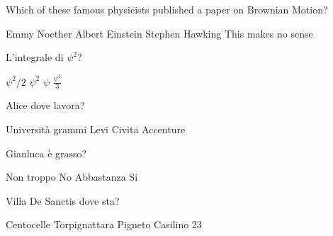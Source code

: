 \documentclass{exam}
\begin{document}
\begin{center}
\end{center}
\vspace{5mm}
\vspace{5mm}
\vspace{5mm}
\begin{questions}
\question[10] Which of these famous physicists published a paper on Brownian Motion?
\begin{choices}
\choice Emmy Noether
\choice Albert Einstein
\choice Stephen Hawking 
\choice This makes no sense
\end{choices}
\question[10] L'integrale di $\psi^{2}$?
\begin{choices}
\choice $\psi^{2}/2$
\choice $\psi^{2}$
\choice $\psi$
\choice $\frac{\psi^{3}}{3}$
\end{choices}
\question[10] Alice dove lavora?
\begin{choices}
\choice Università
 grammi
\choice Levi Civita
\choice Accenture
\end{choices}
\question[10] Gianluca è grasso?
\begin{choices}
\choice Non troppo
\choice No
\choice Abbastanza
\choice Si
\end{choices}
\question[10] Villa De Sanctis dove sta?
\begin{choices}
\choice Centocelle
\choice Torpignattara
\choice Pigneto
\choice Casilino 23
\end{choices}
\end{questions}
           
\end{document}
